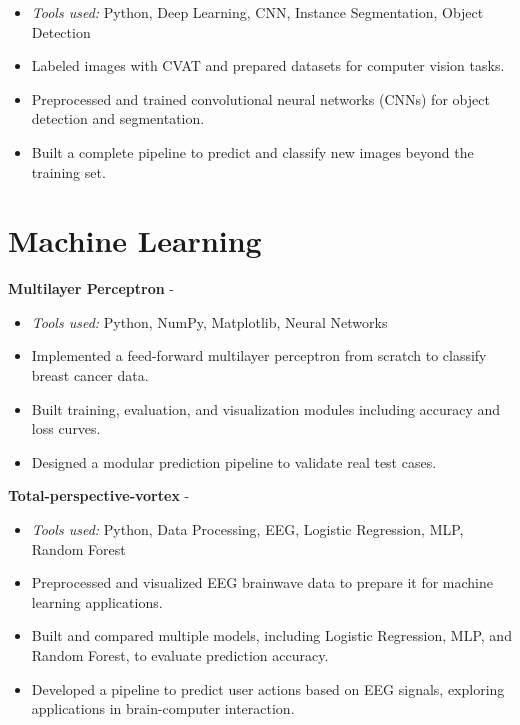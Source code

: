 \documentclass[a4paper,11pt]{article}%
\begin{document}
\begin{itemize}[leftmargin=2em,label={},parsep=0pt,topsep=1em]%
\item \textit{Tools used:} Python, Deep Learning, CNN, Instance Segmentation, Object Detection%
\item Labeled images with CVAT and prepared datasets for computer vision tasks.%
\item Preprocessed and trained convolutional neural networks (CNNs) for object detection and segmentation.%
\item Built a complete pipeline to predict and classify new images beyond the training set.%
\end{itemize}%
\section*{Machine Learning}%
%
\noindent \textbf{Multilayer Perceptron} - \href{https://github.com/sboof911/Multilayer-Perceptron}{{}}%
\begin{itemize}[leftmargin=2em,label={},parsep=0pt,topsep=1em]%
\item \textit{Tools used:} Python, NumPy, Matplotlib, Neural Networks%
\item Implemented a feed-forward multilayer perceptron from scratch to classify breast cancer data.%
\item Built training, evaluation, and visualization modules including accuracy and loss curves.%
\item Designed a modular prediction pipeline to validate real test cases.%
\end{itemize}%
%
\noindent \textbf{Total-perspective-vortex} - \href{https://github.com/sboof911/total-perspectivevortex}{{}}%
\begin{itemize}[leftmargin=2em,label={},parsep=0pt,topsep=1em]%
\item \textit{Tools used:} Python, Data Processing, EEG, Logistic Regression, MLP, Random Forest%
\item Preprocessed and visualized EEG brainwave data to prepare it for machine learning applications.%
\item Built and compared multiple models, including Logistic Regression, MLP, and Random Forest, to evaluate prediction accuracy.%
\item Developed a pipeline to predict user actions based on EEG signals, exploring applications in brain-computer interaction.%
\end{itemize}%
\end{document}
